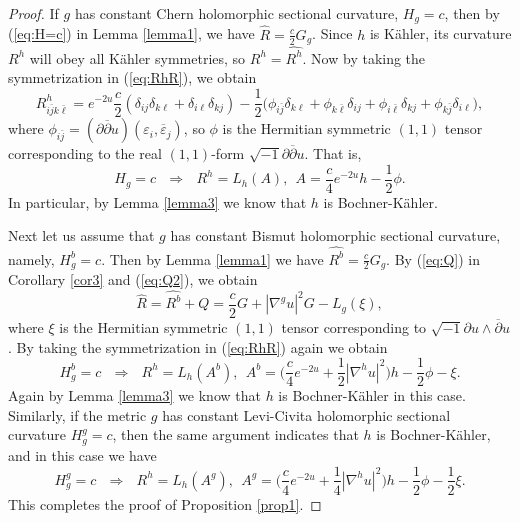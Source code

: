 \documentclass{amsart}
\numberwithin{equation}{section}
\begin{document}
\begin{proof}
If $g$ has constant Chern holomorphic sectional curvature, $H_g=c$, then by (\ref{eq:H=c}) in Lemma \ref{lemma1}, we have $\widehat{R}=\frac{c}{2}G_g$. Since $h$ is K\"ahler, its curvature $R^h$ will obey all K\"ahler symmetries, so $R^h=\widehat{R^h}$. Now by taking the symmetrization in (\ref{eq:RhR}),  we obtain
$$ R^h_{i\bar{j}k\bar{\ell}} = e^{-2u}\frac{c}{2}(\delta_{ij}\delta_{k\ell}+\delta_{i\ell}\delta_{kj} ) -\frac12 \big( \phi_{i\bar{j}} \delta_{k\ell} + \phi_{k\bar{\ell}} \delta_{ij} + \phi_{i\bar{\ell }} \delta_{kj} + \phi_{k\bar{j}} \delta_{i\ell} \big),  $$
where $\phi_{i\bar{j}} = (\partial \overline{\partial}u)(\varepsilon_i, \overline{\varepsilon}_j)$, so $\phi$ is the Hermitian symmetric $(1,1)$ tensor corresponding to the real $(1,1)$-form $\sqrt{-1}\partial \overline{\partial}u$. That is,
\begin{equation} \label{eq:Ac}
H_g=c \ \ \ \Longrightarrow \ \ \ R^h=L_h(A), \ \ A=\frac{c}{4}e^{-2u}h - \frac12 \phi.
\end{equation}
In particular, by Lemma \ref{lemma3} we know that $h$ is Bochner-K\"ahler.

Next let us assume that $g$ has constant Bismut holomorphic sectional curvature, namely, $H^b_g=c$. Then by Lemma \ref{lemma1} we have $\widehat{R^b}=\frac{c}{2}G_g$. By (\ref{eq:Q}) in Corollary \ref{cor3} and (\ref{eq:Q2}), we obtain
$$ \widehat{R} = \widehat{R^b} + Q = \frac{c}{2}G + |\nabla^g u|^2 G - L_g(\xi), $$
where $\xi$ is the Hermitian symmetric $(1,1)$ tensor corresponding to  $\sqrt{-1}\partial u\wedge \overline{\partial}u$. By taking the symmetrization in (\ref{eq:RhR}) again  we obtain
\begin{equation}  \label{eq:Ab}
H_g^b=c \ \ \ \Longrightarrow \ \ \ R^h=L_h(A^b), \ \ A^b=\big(\frac{c}{4}e^{-2u}+\frac12 |\nabla^hu|^2\big)h - \frac12 \phi -\xi.
\end{equation}
Again by  Lemma \ref{lemma3} we know that $h$ is Bochner-K\"ahler in this case. Similarly, if the metric $g$ has constant Levi-Civita holomorphic sectional curvature $H_g^g=c$, then the same argument indicates that $h$ is Bochner-K\"ahler, and in this case we have
\begin{equation} \label{eq:Ag}
H_g^g=c \ \ \ \Longrightarrow \ \ \ R^h=L_h(A^g), \ \ A^g=\big(\frac{c}{4}e^{-2u}+\frac14 |\nabla^hu|^2\big)h - \frac12 \phi -\frac12 \xi.
\end{equation}
This completes the proof of Proposition \ref{prop1}.
\end{proof}
\end{document}

